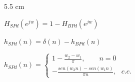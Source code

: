 \begin{frame}
\begin{columns}[T]
\begin{column}{5.5 cm}
{\color{gray}
$H_{SPd}(e^{jw})=1-H_{BPd}(e^{jw})$


\vspace{0.1cm}

$h_{SPd}(n)=\delta(n)-h_{BPd}(n)$

\color{black}


\vspace{0.1cm}

$h_{SPd}(n)=\!\left \{\!\!\!\begin{array}{l}1-\frac{w_2-w_1}{\pi}, \:\:\:  \:\:\: \:\:\: n=0\\ -\frac{sen(w_2n)-sen(w_1n)}{\pi n},  \:\:\: c.c.\end{array}  \right . $
}

\end{column}
\end{columns}




\end{frame}


